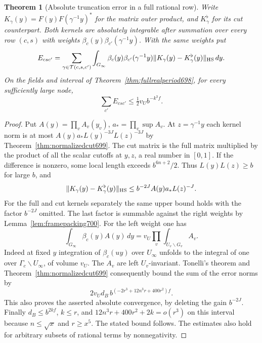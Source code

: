 \documentclass[a4paper,11pt]{article}
\newtheorem{theorem}[proposition]{Theorem}
\theoremstyle{definition}
\theoremstyle{remark}
\numberwithin{equation}{section}
\begin{document}
\begin{theorem}[Absolute truncation error in a full rational row]\leavevmode
\label{thm:globalamplitudetail700}
Write \(K_\gamma(y)=F(y)F(\gamma^{-1}y)^*\) for the matrix
outer product, and \(K_\gamma^\flat\) for its cut counterpart.
Both kernels are absolutely integrable after summation over
every row \((c,s)\) with weights
\(\beta_c(y)\beta_{c'}(\gamma^{-1}y)\). With the same weights put
\[
 E_{csc'}=\sum_{\gamma\in\mathcal T(c,s,c')}\int_{G_\infty}
  \beta_c(y)\beta_{c'}(\gamma^{-1}y)
  \|K_\gamma(y)-K_\gamma^\flat(y)\|_{\rm HS}\,dy .
\]
On the fields and interval of Theorem~\ref{thm:fullrealperiod698},
for every sufficiently large node,
\[
                         \sum_{c'}E_{csc'}
                         \le \tfrac12 v_U b^{-k^3f}.
\]
\end{theorem}
\begin{proof}
Put \(A(y)=\prod_v A_v(y_v)\), \(a_*=\prod_v\sup A_v\).
At \(z=\gamma^{-1}y\) each kernel norm is at most
\(A(y)a_*L(y)^{-3J}L(z)^{-3J}\) by
Theorem~\ref{thm:normalizedcut699}. The cut matrix is the
full matrix multiplied by the product of all the scalar cutoffs
at \(y,z\), a real number in \([0,1]\). If the difference is
nonzero, some local length exceeds \(b^{6n+2}/2\).
Thus \(L(y)L(z)\ge b\) for large \(b\), and
\[
       \|K_\gamma(y)-K_\gamma^\flat(y)\|_{\rm HS}
           \le b^{-2J} A(y)a_*L(z)^{-J}.
\]
For the full and cut kernels separately the same upper bound
holds with the factor \(b^{-2J}\) omitted. The last factor is
summable against the right weights by Lemma~\ref{lem:framepacking700}.
For the left weight one has
\[
       \int_{G_\infty}\beta_c(y) A(y)\,dy
           =v_U\prod_v\int_{U_v\backslash G_v}A_v .
\]
Indeed at fixed \(y\) integration of \(\beta_c(uy)\) over
\(U_\infty\) unfolds to the integral of one over
\(\Gamma_c\backslash U_\infty\), of volume \(v_U\).
The \(A_v\) are left \(U_v\)-invariant. Tonelli's theorem and
Theorem~\ref{thm:normalizedcut699} consequently bound the
sum of the error norms by
\[
        2v_U d_B\, b^{(-2r^3+12n^3r+400r^2)f}.
\]
This also proves the asserted absolute convergence, by deleting
the gain \(b^{-2J}\). Finally \(d_B\le b^{2kf}\),
\(k\le r\), and \(12n^3 r+400r^2+2k=o(r^3)\) on this interval
because \(n\le\sqrt x\) and \(r\ge x^5\). The stated bound
follows. The estimates also hold for arbitrary subsets of
rational terms by nonnegativity.
\end{proof}
\end{document}
